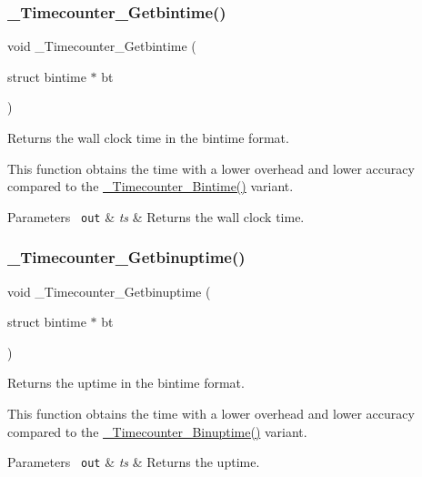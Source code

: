 \subsubsection{\texorpdfstring{\_Timecounter\_Getbintime()}{\_Timecounter\_Getbintime()}}
{\footnotesize\ttfamily void \+\_\+\+Timecounter\+\_\+\+Getbintime (\begin{DoxyParamCaption}\item[{struct bintime $\ast$}]{bt }\end{DoxyParamCaption})}



Returns the wall clock time in the bintime format. 

This function obtains the time with a lower overhead and lower accuracy compared to the \mbox{\hyperlink{group__RTEMSScoreTimecounter_ga988aedc781dc73e89a481adb99455d21}{\+\_\+\+Timecounter\+\_\+\+Bintime()}} variant.


\begin{DoxyParams}[1]{Parameters}
\mbox{\texttt{ out}}  & {\em ts} & Returns the wall clock time. \\
\hline
\end{DoxyParams}
\mbox{\label{group__RTEMSScoreTimecounter_ga9a538f7e17a92fb637644a431ce00702}} 
\subsubsection{\texorpdfstring{\_Timecounter\_Getbinuptime()}{\_Timecounter\_Getbinuptime()}}
{\footnotesize\ttfamily void \+\_\+\+Timecounter\+\_\+\+Getbinuptime (\begin{DoxyParamCaption}\item[{struct bintime $\ast$}]{bt }\end{DoxyParamCaption})}



Returns the uptime in the bintime format. 

This function obtains the time with a lower overhead and lower accuracy compared to the \mbox{\hyperlink{group__RTEMSScoreTimecounter_ga8c656c32ac30398dedcec9f43163bee4}{\+\_\+\+Timecounter\+\_\+\+Binuptime()}} variant.


\begin{DoxyParams}[1]{Parameters}
\mbox{\texttt{ out}}  & {\em ts} & Returns the uptime. \\
\hline
\end{DoxyParams}
\mbox{\label{group__RTEMSScoreTimecounter_ga46836e8f099926fe84e24d8e5407703b}} 
